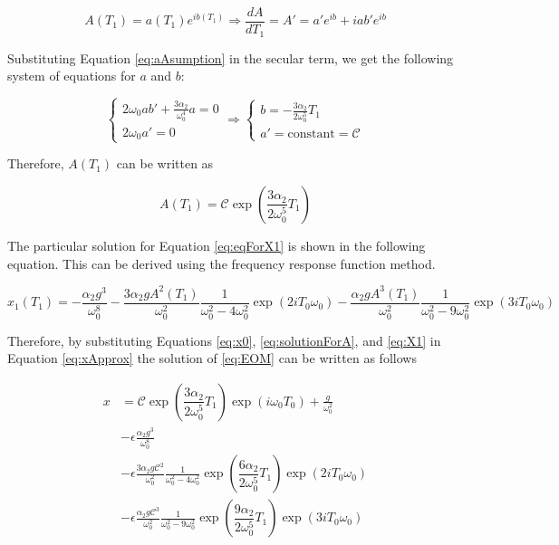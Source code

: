 %
\begin{equation}\label{eq:aAsumption}
	A(T_1) = a(T_1) e^{ib(T_1)} \Rightarrow
	\frac{dA}{dT_1} = A' = a' e^{ib} + iab' e^{ib}
\end{equation}
%

Substituting Equation \eqref{eq:aAsumption} in the secular term, we get the following system of equations for $a$ and $b$:

%
\[
\begin{cases}
	2\omega_0 a b' + \frac{3\alpha_2}{\omega_0^4}a = 0 \\
	2 \omega_0 a' = 0
\end{cases}
\Rightarrow
\begin{cases}
	b = -\frac{3 \alpha_2}{2 \omega_0^5} T_1 \\
	a' = \text{constant} = \mathcal{C}
\end{cases}
\]
%

Therefore, $A(T_1)$ can be written as

%
\begin{equation}\label{eq:solutionForA}
	A(T_1) = \mathcal{C}
	         \exp\left(\dfrac{3 \alpha_2}{2 \omega_0^5} T_1\right)
\end{equation}
%

The particular solution for Equation \eqref{eq:eqForX1} is shown in the following equation. This can be derived using the frequency response function method.

%
\begin{equation}\label{eq:X1}
	x_1(T_1) = -\frac{\alpha_2 g^3}{\omega_0^8} -
	\frac{3 \alpha_2 g A^2(T_1)}{\omega_0^2}
	\frac{1}{\omega_0^2 - 4\omega_0^2}
	\exp \left( 2iT_0 \omega_0 \right) -
	\frac{\alpha_2 g A^3(T_1)}{\omega_0^2}
	\frac{1}{\omega_0^2 - 9\omega_0^2}
	\exp \left( 3iT_0 \omega_0 \right)
\end{equation}
%

Therefore, by substituting Equations \eqref{eq:x0}, \eqref{eq:solutionForA}, and \eqref{eq:X1} in Equation \eqref{eq:xApprox} the solution of \eqref{eq:EOM} can be written as follows

%
\begin{align}\label{eq:x}
	x &= 
	\mathcal{C}
	\exp\left(\dfrac{3 \alpha_2}{2 \omega_0^5} T_1\right)
	\exp \left( i\omega_0 T_0 \right) + \frac{g}{\omega_0^2} \nonumber
	\\
	&-\epsilon \frac{\alpha_2 g^3}{\omega_0^8} \nonumber
	\\
	&-\epsilon \frac{3 \alpha_2 g \mathcal{C}^2}{\omega_0^2}
	\frac{1}{\omega_0^2 - 4\omega_0^2}
	\exp \left( \dfrac{6 \alpha_2}{2 \omega_0^5} T_1 \right)
	\exp \left( 2iT_0 \omega_0 \right)
	 \nonumber
	\\
	&-\epsilon \frac{\alpha_2 g \mathcal{C}^3}{\omega_0^2}
	\frac{1}{\omega_0^2 - 9\omega_0^2}
	\exp \left( \dfrac{9 \alpha_2}{2 \omega_0^5} T_1 \right)
	\exp \left( 3iT_0 \omega_0 \right)
\end{align}
%

